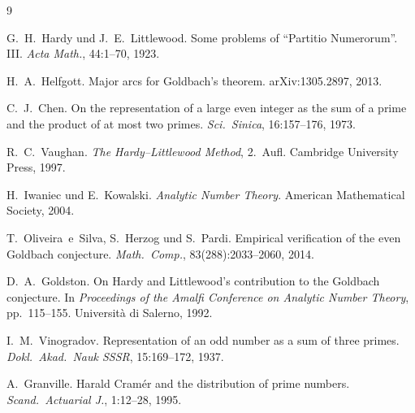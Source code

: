 \documentclass[12pt,a4paper]{amsart}
\theoremstyle{definition}
\begin{document}
\begin{thebibliography}{9}

G.~H.~Hardy und J.~E.~Littlewood.
\newblock Some problems of ``Partitio Numerorum''.  III.
\newblock \emph{Acta Math.}, 44:1--70, 1923.

H.~A.~Helfgott.
\newblock Major arcs for Goldbach's theorem.
\newblock arXiv:1305.2897, 2013.

C.~J.~Chen.
\newblock On the representation of a large even integer as the sum of a prime
  and the product of at most two primes.
\newblock \emph{Sci.\ Sinica}, 16:157--176, 1973.

R.~C.~Vaughan.
\newblock \emph{The Hardy--Littlewood Method}, 2.~Aufl.
\newblock Cambridge University Press, 1997.

H.~Iwaniec und E.~Kowalski.
\newblock \emph{Analytic Number Theory}.
\newblock American Mathematical Society, 2004.

T.~Oliveira~e~Silva, S.~Herzog und S.~Pardi.
\newblock Empirical verification of the even Goldbach conjecture.
\newblock \emph{Math.\ Comp.}, 83(288):2033--2060, 2014.

D.~A.~Goldston.
\newblock On Hardy and Littlewood's contribution to the Goldbach conjecture.
\newblock In \emph{Proceedings of the Amalfi Conference on Analytic Number
  Theory}, pp.\ 115--155.  Universit\`a di Salerno, 1992.

I.~M.~Vinogradov.
\newblock Representation of an odd number as a sum of three primes.
\newblock \emph{Dokl.\ Akad.\ Nauk SSSR}, 15:169--172, 1937.

A.~Granville.
\newblock Harald Cram\'er and the distribution of prime numbers.
\newblock \emph{Scand.\ Actuarial J.}, 1:12--28, 1995.

\end{thebibliography}
\end{document}
